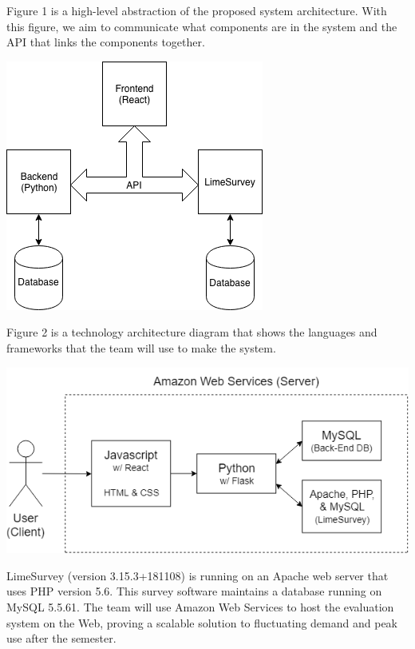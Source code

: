\documentclass{article}
\begin{document}
Figure 1 is a high-level abstraction of the proposed system architecture. With this figure, we aim to communicate what components are in the system and the API that links the components together.

\begin{center}
\vspace{1mm}
\label{fig:componentdiagram}
{\includegraphics[scale=.65]{images/component_diagram.png}} 
\end{center}

\vspace{3mm}

Figure 2 is a technology architecture diagram that shows the languages and frameworks that the team will use to make the system.

\begin{center}
\label{fig:technologydiagram}
{\includegraphics[scale=.6]{images/technology_architecture_diagram.png}} 
\end{center}

LimeSurvey (version 3.15.3+181108) is running on an Apache web server that uses PHP version 5.6. This survey software maintains a database running on MySQL 5.5.61. The team will use Amazon Web Services to host the evaluation system on the Web, proving a scalable solution to fluctuating demand and peak use after the semester.
\end{document}
